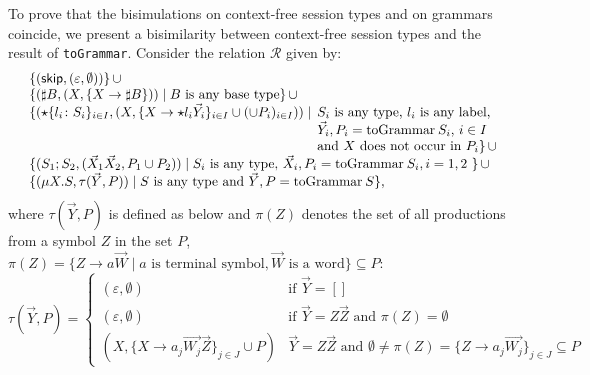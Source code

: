 To prove that the bisimulations on context-free session types and
on grammars coincide, we present a bisimilarity between
context-free session types and the result of \lstinline|toGrammar|.
%
%
Consider the relation $\mathcal{R}$ given by:
\[\begin{array}{lll}
	& \{ (\skipk, (\varepsilon, \emptyset))\} \,\cup\\
	& \{(\sharp B,(X,\{X \rightarrow \sharp B\})) \mid \text{$B$ is any base type}\} 
	   \,\cup\\
	& \{ (\star\{l_i\colon S_i\}_{i\in I}, (X, \{X \rightarrow \star l_i
    \vec Y_i\}_{i\in I} \cup (\cup  P_i)_{i\in I})) \mid 
    \begin{array}[t]{l}
    	\!\!\text{$S_i$ is any type, $l_i$ is any label,}\\
    	\!\!\text{$\vec Y_i, P_i = \toGrammarf{S_i}$, $i \in I$ }\\
    	\!\!\text{and $X$ does not occur in $P_i$}\} \,\cup\\
    \end{array}\\
    &\{(S_1;S_2, (\vec X_1\vec X_2,  P_1 \cup  P_2)) \mid
    \text{$S_i$ is any type, $\vec X_i, P_i = \toGrammarf{S_i}, i = 1,2$ } \}\,\cup\\
	& \{(\mu X.S, \tau(\vec Y, P))\mid
    \text{$S$ is any type and $\vec Y, P = \toGrammarf{S}$}\},\\
\end{array}\]
where $\tau(\vec Y, P)$ is defined as below and $\pi (Z)$
denotes the set of all productions from a symbol $Z$ in the set $P$, 
$\pi (Z) = \{Z \rightarrow a \vec {W}\mid a \text{ is terminal
symbol}, \vec W \text{ is a word}\}\subseteq P$:
\[
\tau (\vec Y, P ) = 
\begin{cases}
	(\varepsilon, \emptyset) & \text{if } \vec Y =[]\\
	(\varepsilon, \emptyset) & \text{if } \vec Y = Z\vec Z \text{ and } \pi(Z) = \emptyset \\	
	(X, \{X \rightarrow a_j \vec {W_j}\vec Z\}_{j\in J} \cup  P) &
	\vec Y = Z\vec Z \text{ and } \emptyset \neq \pi(Z) = 
	\{Z \rightarrow a_j \vec {W_j}\}_{j\in J}\subseteq P
\end{cases}
\]

